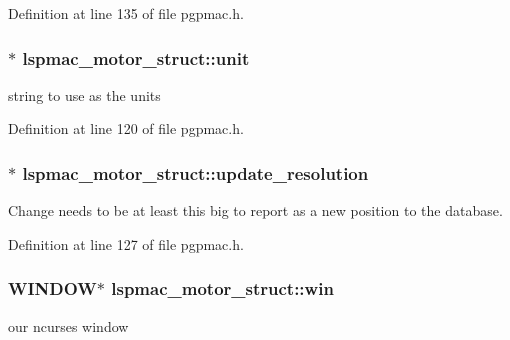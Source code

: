 Definition at line 135 of file pgpmac.\-h.

\hypertarget{structlspmac__motor__struct_af8e6eb1df6b0d343fc4da93fbdd63133}{
\subsubsection[{unit}]{$\ast$ lspmac\-\_\-motor\-\_\-struct\-::unit}}\label{structlspmac__motor__struct_af8e6eb1df6b0d343fc4da93fbdd63133}


string to use as the units 



Definition at line 120 of file pgpmac.\-h.

\hypertarget{structlspmac__motor__struct_aefa84c7592369090eec8b211caaa3a51}{
\subsubsection[{update\-\_\-resolution}]{$\ast$ lspmac\-\_\-motor\-\_\-struct\-::update\-\_\-resolution}}\label{structlspmac__motor__struct_aefa84c7592369090eec8b211caaa3a51}


Change needs to be at least this big to report as a new position to the database. 



Definition at line 127 of file pgpmac.\-h.

\hypertarget{structlspmac__motor__struct_a133775154b0e008f3a2fde6f53bc0eff}{
\subsubsection[{win}]{\setlength{\rightskip}{0pt plus 5cm}W\-I\-N\-D\-O\-W$\ast$ lspmac\-\_\-motor\-\_\-struct\-::win}}\label{structlspmac__motor__struct_a133775154b0e008f3a2fde6f53bc0eff}


our ncurses window 



